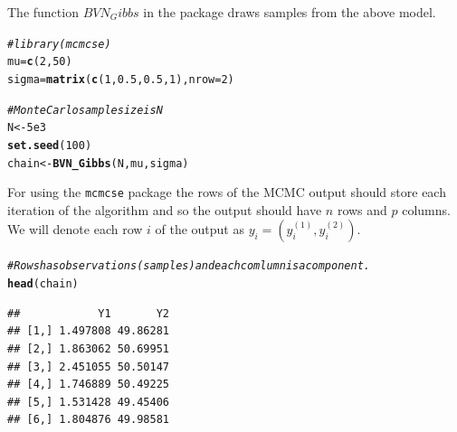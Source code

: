 \documentclass[11pt]{article}\usepackage[]{graphicx}\usepackage[]{color}
\makeatletter
\newcommand{\hlnum}[1]{\textcolor[rgb]{0.686,0.059,0.569}{#1}}%
\newcommand{\hlcom}[1]{\textcolor[rgb]{0.678,0.584,0.686}{\textit{#1}}}%
\newcommand{\hlstd}[1]{\textcolor[rgb]{0.345,0.345,0.345}{#1}}%
\newcommand{\hlkwb}[1]{\textcolor[rgb]{0.69,0.353,0.396}{#1}}%
\newcommand{\hlkwc}[1]{\textcolor[rgb]{0.333,0.667,0.333}{#1}}%
\newcommand{\hlkwd}[1]{\textcolor[rgb]{0.737,0.353,0.396}{\textbf{#1}}}%
\newenvironment{kframe}{%
 \def\at@end@of@kframe{}%
 \ifinner\ifhmode%
  \def\at@end@of@kframe{\end{minipage}}%
  \begin{minipage}{\columnwidth}%
 \fi\fi%
 \def\FrameCommand##1{\hskip\@totalleftmargin \hskip-\fboxsep
 \colorbox{shadecolor}{##1}\hskip-\fboxsep
     \hskip-\linewidth \hskip-\@totalleftmargin \hskip\columnwidth}%
 \MakeFramed {\advance\hsize-\width
   \@totalleftmargin\z@ \linewidth\hsize
   \@setminipage}}%
 {\par\unskip\endMakeFramed%
 \at@end@of@kframe}
\newenvironment{knitrout}{}{} %
\makeatother
\begin{document}
The function $BVN_Gibbs$ in the package draws samples from the above model. 

\begin{knitrout}
\color{fgcolor}\begin{kframe}
\begin{alltt}
\hlcom{#library(mcmcse)}
\hlstd{mu} \hlkwb{=} \hlkwd{c}\hlstd{(}\hlnum{2}\hlstd{,} \hlnum{50}\hlstd{)}
\hlstd{sigma} \hlkwb{=} \hlkwd{matrix}\hlstd{(}\hlkwd{c}\hlstd{(}\hlnum{1}\hlstd{,} \hlnum{0.5}\hlstd{,} \hlnum{0.5}\hlstd{,} \hlnum{1}\hlstd{),} \hlkwc{nrow} \hlstd{=} \hlnum{2}\hlstd{)}

\hlcom{# Monte Carlo sample size is N}
\hlstd{N} \hlkwb{<-} \hlnum{5e3}
\hlkwd{set.seed}\hlstd{(}\hlnum{100}\hlstd{)}
\hlstd{chain} \hlkwb{<-} \hlkwd{BVN_Gibbs}\hlstd{(N, mu, sigma)}
\end{alltt}
\end{kframe}
\end{knitrout}

For using the \texttt{mcmcse} package the rows of the MCMC output should store each iteration of the algorithm and so the output should have $n$ rows and $p$ columns. We will denote each row $i$ of the output as $y_i = (y^{(1)}_i, y^{(2)}_i)$.

\begin{knitrout}
\color{fgcolor}\begin{kframe}
\begin{alltt}
\hlcom{#Rows has observations (samples) and each comlumn is a component. }
\hlkwd{head}\hlstd{(chain)}
\end{alltt}
\begin{verbatim}
##            Y1       Y2
## [1,] 1.497808 49.86281
## [2,] 1.863062 50.69951
## [3,] 2.451055 50.50147
## [4,] 1.746889 50.49225
## [5,] 1.531428 49.45406
## [6,] 1.804876 49.98581
\end{verbatim}
\end{kframe}
\end{knitrout}
\end{document}
